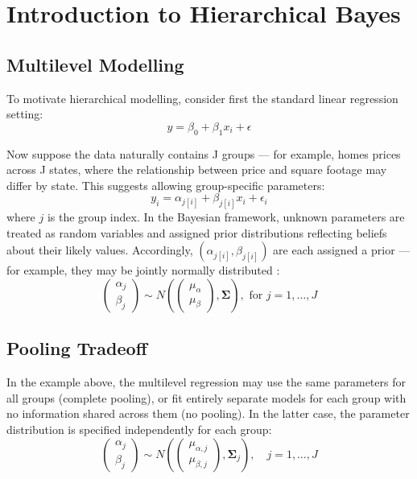 \section{Introduction to Hierarchical Bayes}

\subsection{Multilevel Modelling}
To motivate hierarchical modelling, consider first the standard linear regression setting:
\[
y = \beta_0 + \beta_1 x_i + \epsilon
\]

Now suppose the data naturally contains J groups — for example, homes prices across J states, where the relationship between price and square footage may differ by state. 
This suggests allowing group-specific parameters:
\[
y_i = \alpha_{j[i]} + \beta_{j[i]} x_i + \epsilon_i
\]
where $j$ is the group index. In the Bayesian framework, unknown parameters are treated as random variables and assigned prior distributions reflecting beliefs about their likely values.
Accordingly, $(\alpha_{j[i]}, \beta_{j[i]})$ are each assigned a prior — for example, they may be jointly normally distributed \cite{GelmanHill2007}:
\[
\begin{pmatrix} 
\alpha_j \\ 
\beta_j 
\end{pmatrix} 
\sim N \left( 
\begin{pmatrix} 
\mu_{\alpha} \\ 
\mu_{\beta} 
\end{pmatrix}, \mathbf{\Sigma} 
\right), \text{ for } j = 1, \dots, J
\]

\subsection{Pooling Tradeoff}
In the example above, the multilevel regression may use the same parameters for all groups (complete pooling), or fit entirely separate models for each group with no information shared across them (no pooling). 
In the latter case, the parameter distribution is specified independently for each group:
\[
\begin{pmatrix} 
\alpha_j \\ 
\beta_j 
\end{pmatrix} 
\sim N \left( 
\begin{pmatrix} 
\mu_{\alpha, j} \\ 
\mu_{\beta, j} 
\end{pmatrix}, \mathbf{\Sigma}_j 
\right), \quad j = 1, \dots, J
\]

